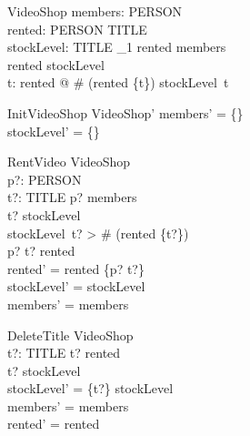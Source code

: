 \documentclass{article}
\begin{document}
\begin{zed}
[PERSON]
\end{zed}

\begin{zed}
[TITLE]
\end{zed}

\begin{schema}{VideoShop}
members: \power PERSON \\
rented: PERSON \rel TITLE \\
stockLevel: TITLE \pfun \nat_1
\where
\dom rented \subseteq members \\
\ran rented \subseteq \dom stockLevel \\
\forall t: \ran rented @
\# (rented \rres \{t\}) \leq stockLevel~t
\end{schema}

\begin{schema}{InitVideoShop}
VideoShop'
\where
members' = \{\} \\
stockLevel' = \{\}
\end{schema}

\begin{schema}{RentVideo}
\Delta VideoShop\\
p?: PERSON \\
t?: TITLE
\where
p? \in members \\
t? \in \dom stockLevel \\
stockLevel~t? > \# (rented \rres \{t?\}) \\
p? \mapsto t? \notin rented\\
rented' = rented \cup \{p? \mapsto t?\} \\
stockLevel' = stockLevel\\
members' = members
\end{schema}


\begin{schema}{DeleteTitle}
\Delta VideoShop \\
t?: TITLE
\where
t? \notin \ran rented\\
t? \in \dom stockLevel\\
stockLevel' = \{t?\} \ndres stockLevel\\
members' = members\\
rented' = rented
\end{schema}
\end{document}
